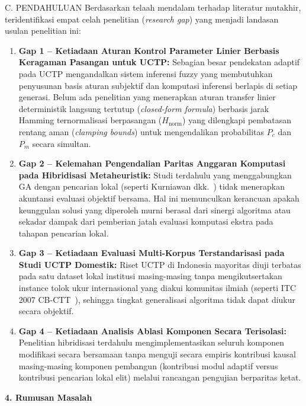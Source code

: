 \documentclass[letterpaper,12pt,oneside]{article}
\newcommand{\subheading}[2]{%
  \par\vspace{0.8em}\noindent
  \textbf{#1. #2}\par\vspace{0.3em}
}
\begin{document}
\begin{wordsection}{C. PENDAHULUAN}
Berdasarkan telaah mendalam terhadap literatur mutakhir, teridentifikasi empat celah penelitian (\textit{research gap}) yang menjadi landasan usulan penelitian ini:
\begin{enumerate}
    \item \textbf{Gap 1 -- Ketiadaan Aturan Kontrol Parameter Linier Berbasis Keragaman Pasangan untuk UCTP:} Sebagian besar pendekatan adaptif pada UCTP mengandalkan sistem inferensi fuzzy yang membutuhkan penyusunan basis aturan subjektif dan komputasi inferensi berlapis di setiap generasi. Belum ada penelitian yang menerapkan aturan transfer linier deterministik langsung tertutup (\textit{closed-form formula}) berbasis jarak Hamming ternormalisasi berpasangan ($H_{\text{norm}}$) yang dilengkapi pembatasan rentang aman (\textit{clamping bounds}) untuk mengendalikan probabilitas $P_c$ dan $P_m$ secara simultan.
    \item \textbf{Gap 2 -- Kelemahan Pengendalian Paritas Anggaran Komputasi pada Hibridisasi Metaheuristik:} Studi terdahulu yang menggabungkan GA dengan pencarian lokal (seperti Kurniawan dkk.~\cite{kurniawan2025elite}) tidak menerapkan akuntansi evaluasi objektif bersama. Hal ini memunculkan kerancuan apakah keunggulan solusi yang diperoleh murni berasal dari sinergi algoritma atau sekadar dampak dari pemberian jatah evaluasi komputasi ekstra pada tahapan pencarian lokal.
    \item \textbf{Gap 3 -- Ketiadaan Evaluasi Multi-Korpus Terstandarisasi pada Studi UCTP Domestik:} Riset UCTP di Indonesia mayoritas diuji terbatas pada satu dataset lokal institusi masing-masing tanpa mengikutsertakan instance tolok ukur internasional yang diakui komunitas ilmiah (seperti ITC 2007 CB-CTT~\cite{mccollum2009setting}), sehingga tingkat generalisasi algoritma tidak dapat diukur secara objektif.
    \item \textbf{Gap 4 -- Ketiadaan Analisis Ablasi Komponen Secara Terisolasi:} Penelitian hibridisasi terdahulu mengimplementasikan seluruh komponen modifikasi secara bersamaan tanpa menguji secara empiris kontribusi kausal masing-masing komponen pembangun (kontribusi modul adaptif versus kontribusi pencarian lokal elit) melalui rancangan pengujian berparitas ketat.
\end{enumerate}

\subheading{4}{Rumusan Masalah}


\end{wordsection}
\end{document}
